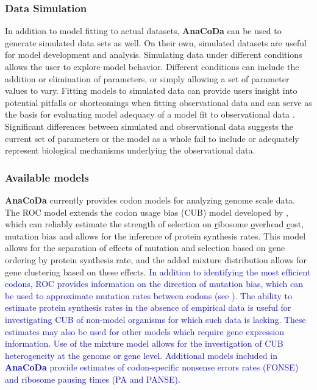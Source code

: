 \documentclass{bioinfo}
\newcommand{\package}{\textbf{AnaCoDa }} %
\begin{document}
\subsubsection*{Data Simulation}
In addition to model fitting to actual datasets, \package can be used to generate simulated data sets as well.
On their own, simulated datasets are useful for model development and analysis.
Simulating data under different conditions allows the user to explore model behavior. 
Different conditions can include the addition or elimination of parameters, or simply allowing a set of parameter values to vary.
Fitting models to simulated data can provide users insight into potential pitfalls or shortcomings when fitting observational data and can serve as the basis for evaluating model adequacy of a model fit to observational data \citep{gumi2015}.
Significant differences between simulated and observational data suggests the current set of parameters or the model as a whole fail to include or adequately represent biological mechanisms underlying the observational data.
 
\subsubsection*{Available models}
\package currently provides codon models for analyzing genome scale data.
The ROC model extends the codon usage bias (CUB) model developed by \citet{gilchrist2015,wallace2013,shah2011}, which can reliably estimate the strength of selection on \underline{r}ibosome \underline{o}verhead \underline{c}ost, mutation bias and allows for the inference of protein synthesis rates.
This model allows for the separation of effects of mutation and selection based on gene ordering by protein synthesis rate, and the added mixture distribution allows for gene clustering based on these effects.
\textcolor{blue}{
In addition to identifying the most efficient codons, ROC provides information on the direction of mutation bias, which can be used to approximate mutation rates between codons (see \citet{gilchrist2015,wallace2013}).
The ability to estimate protein synthesis rates in the absence of empirical data is useful for investigating CUB of non-model organisms for which such data is lacking.
These estimates may also be used for other models which require gene expression information. 
Use of the mixture model allows for the investigation of CUB heterogeneity at the genome or gene level.  
Additional models included in \package provide estimates of codon-specific nonsense errors rates (FONSE) and ribosome pausing times (PA and PANSE).
}
\end{document}
